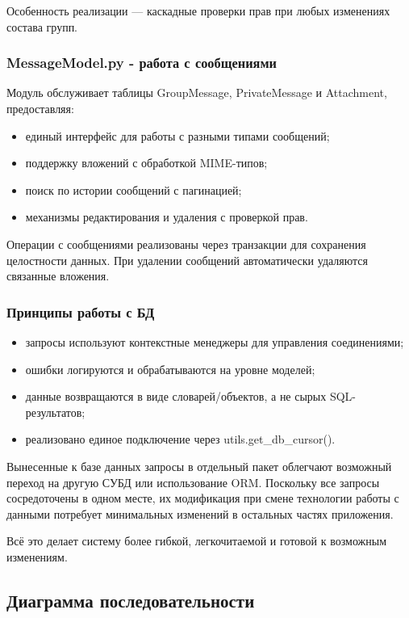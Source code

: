 Особенность реализации — каскадные проверки прав при любых изменениях состава групп.

\subsubsection{MessageModel.py - работа с сообщениями}
Модуль обслуживает таблицы GroupMessage, PrivateMessage и Attachment, предоставляя:
\begin{itemize}
	\item единый интерфейс для работы с разными типами сообщений;
	\item поддержку вложений с обработкой MIME-типов;
	\item поиск по истории сообщений с пагинацией;
	\item механизмы редактирования и удаления с проверкой прав.
\end{itemize}

Операции с сообщениями реализованы через транзакции для сохранения целостности данных. При удалении сообщений автоматически удаляются связанные вложения.

\subsubsection{Принципы работы с БД}
\begin{itemize}
	\item запросы используют контекстные менеджеры для управления соединениями;
	\item ошибки логируются и обрабатываются на уровне моделей;
	\item данные возвращаются в виде словарей/объектов, а не сырых SQL-результатов;
	\item реализовано единое подключение через utils.get\_db\_cursor().
\end{itemize}

Вынесенные к базе данных запросы в отдельный пакет облегчают возможный переход на другую СУБД или использование ORM. Поскольку все запросы сосредоточены в одном месте, их модификация при смене технологии работы с данными потребует минимальных изменений в остальных частях приложения.

Всё это делает систему более гибкой, легкочитаемой и готовой к возможным изменениям.

\subsection{Диаграмма последовательности}

